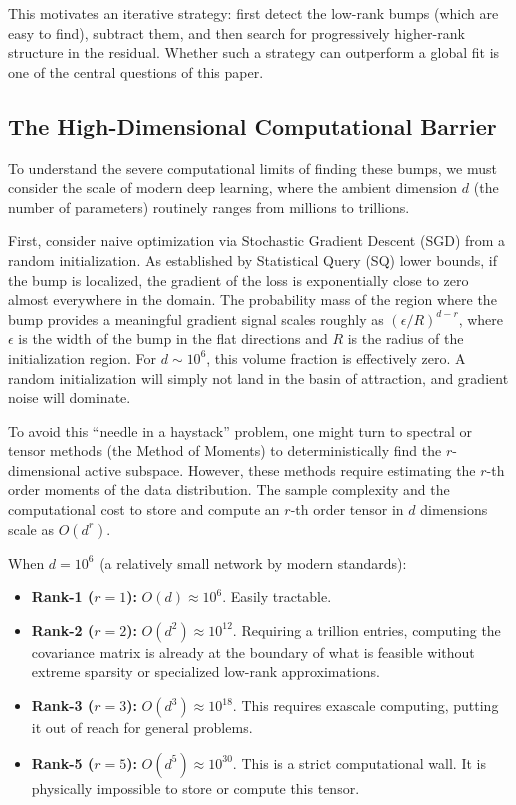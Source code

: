 \documentclass{article}
\begin{document}
This motivates an iterative strategy: first detect the low-rank bumps
(which are easy to find), subtract them, and then search for
progressively higher-rank structure in the residual. Whether such a
strategy can outperform a global fit is one of the central questions
of this paper.

\subsection{The High-Dimensional Computational Barrier}

To understand the severe computational limits of finding these bumps, we must
consider the scale of modern deep learning, where the ambient dimension $d$
(the number of parameters) routinely ranges from millions to trillions.

First, consider naive optimization via Stochastic Gradient Descent (SGD) from a
random initialization. As established by Statistical Query (SQ) lower bounds,
if the bump is localized, the gradient of the loss is exponentially close to
zero almost everywhere in the domain. The probability mass of the region where
the bump provides a meaningful gradient signal scales roughly as
$(\epsilon/R)^{d-r}$, where $\epsilon$ is the width of the bump in the flat
directions and $R$ is the radius of the initialization region. For $d \sim 10^6$,
this volume fraction is effectively zero. A random initialization will simply
not land in the basin of attraction, and gradient noise will dominate.

To avoid this ``needle in a haystack'' problem, one might turn to spectral or
tensor methods (the Method of Moments) to deterministically find the
$r$-dimensional active subspace. However, these methods require estimating the
$r$-th order moments of the data distribution. The sample complexity and the
computational cost to store and compute an $r$-th order tensor in $d$ dimensions
scale as $O(d^r)$.

When $d = 10^6$ (a relatively small network by modern standards):
\begin{itemize}
  \item \textbf{Rank-1 ($r=1$):} $O(d) \approx 10^6$. Easily tractable.
  \item \textbf{Rank-2 ($r=2$):} $O(d^2) \approx 10^{12}$. Requiring a trillion
    entries, computing the covariance matrix is already at the boundary of what
    is feasible without extreme sparsity or specialized low-rank approximations.
  \item \textbf{Rank-3 ($r=3$):} $O(d^3) \approx 10^{18}$. This requires
    exascale computing, putting it out of reach for general problems.
  \item \textbf{Rank-5 ($r=5$):} $O(d^5) \approx 10^{30}$. This is a strict
    computational wall. It is physically impossible to store or compute this
    tensor.
\end{itemize}
\end{document}
